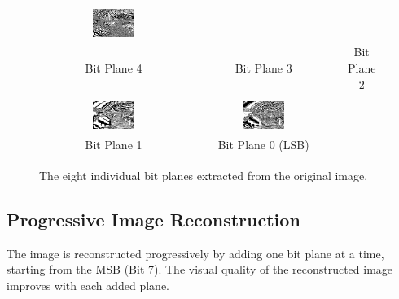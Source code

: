 \documentclass{article}
\begin{document}
\begin{figure}[H]
\begin{tabular}{ccc}
        \includegraphics[width=0.3\textwidth]{images/bit_plane_2.png} \\
        Bit Plane 4 & Bit Plane 3 & Bit Plane 2 \\
        \\
        \includegraphics[width=0.3\textwidth]{images/bit_plane_1.png} &
        \includegraphics[width=0.3\textwidth]{images/bit_plane_0.png} &
        \\
        Bit Plane 1 & Bit Plane 0 (LSB) & \\
    \end{tabular}
    \caption{The eight individual bit planes extracted from the original image.}
    \label{fig:bitplanes}
\end{figure}

\clearpage
\subsection{Progressive Image Reconstruction}
The image is reconstructed progressively by adding one bit plane at a time, starting from the MSB (Bit 7). The visual quality of the reconstructed image improves with each added plane.
\end{document}
